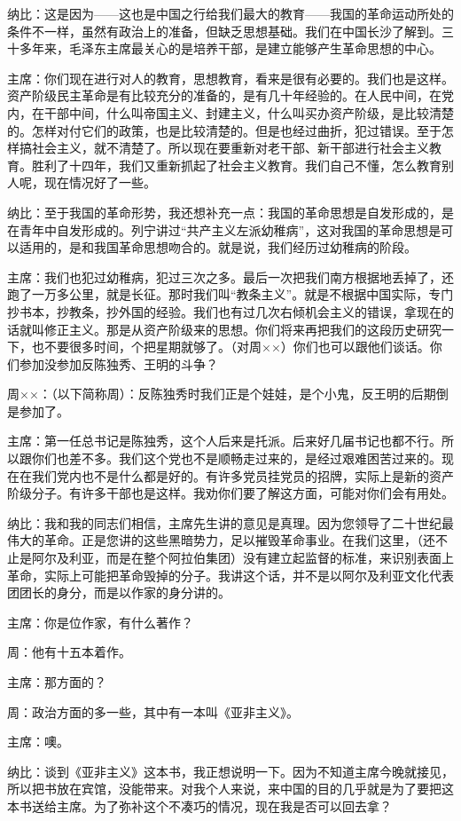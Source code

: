 纳比：这是因为——这也是中国之行给我们最大的教育——我国的革命运动所处的条件不一样，虽然有政治上的准备，但缺乏思想基础。我们在中国长沙了解到。三十多年来，毛泽东主席最关心的是培养干部，是建立能够产生革命思想的中心。

主席：你们现在进行对人的教育，思想教育，看来是很有必要的。我们也是这样。资产阶级民主革命是有比较充分的准备的，是有几十年经验的。在人民中间，在党内，在干部中间，什么叫帝国主义、封建主义，什么叫买办资产阶级，是比较清楚的。怎样对付它们的政策，也是比较清楚的。但是也经过曲折，犯过错误。至于怎样搞社会主义，就不清楚了。所以现在要重新对老干部、新干部进行社会主义教育。胜利了十四年，我们又重新抓起了社会主义教育。我们自己不懂，怎么教育别人呢，现在情况好了一些。

纳比：至于我国的革命形势，我还想补充一点：我国的革命思想是自发形成的，是在青年中自发形成的。列宁讲过“共产主义左派幼稚病”，这对我国的革命思想是可以适用的，是和我国革命思想吻合的。就是说，我们经历过幼稚病的阶段。

主席：我们也犯过幼稚病，犯过三次之多。最后一次把我们南方根据地丢掉了，还跑了一万多公里，就是长征。那时我们叫“教条主义”。就是不根据中国实际，专门抄书本，抄教条，抄外国的经验。我们也有过几次右倾机会主义的错误，拿现在的话就叫修正主义。那是从资产阶级来的思想。你们将来再把我们的这段历史研究一下，也不要很多时间，个把星期就够了。（对周××）你们也可以跟他们谈话。你们参加没参加反陈独秀、王明的斗争？

周××：（以下简称周）：反陈独秀时我们正是个娃娃，是个小鬼，反王明的后期倒是参加了。

主席：第一任总书记是陈独秀，这个人后来是托派。后来好几届书记也都不行。所以跟你们也差不多。我们这个党也不是顺畅走过来的，是经过艰难困苦过来的。现在在我们党内也不是什么都是好的。有许多党员挂党员的招牌，实际上是新的资产阶级分子。有许多干部也是这样。我劝你们要了解这方面，可能对你们会有用处。

纳比：我和我的同志们相信，主席先生讲的意见是真理。因为您领导了二十世纪最伟大的革命。正是您讲的这些黑暗势力，足以摧毁革命事业。在我们这里，（还不止是阿尔及利亚，而是在整个阿拉伯集团）没有建立起监督的标准，来识别表面上革命，实际上可能把革命毁掉的分子。我讲这个话，并不是以阿尔及利亚文化代表团团长的身分，而是以作家的身分讲的。

主席：你是位作家，有什么著作？

周：他有十五本着作。

主席：那方面的？

周：政治方面的多一些，其中有一本叫《亚非主义》。

主席：噢。

纳比：谈到《亚非主义》这本书，我正想说明一下。因为不知道主席今晚就接见，所以把书放在宾馆，没能带来。对我个人来说，来中国的目的几乎就是为了要把这本书送给主席。为了弥补这个不凑巧的情况，现在我是否可以回去拿？

